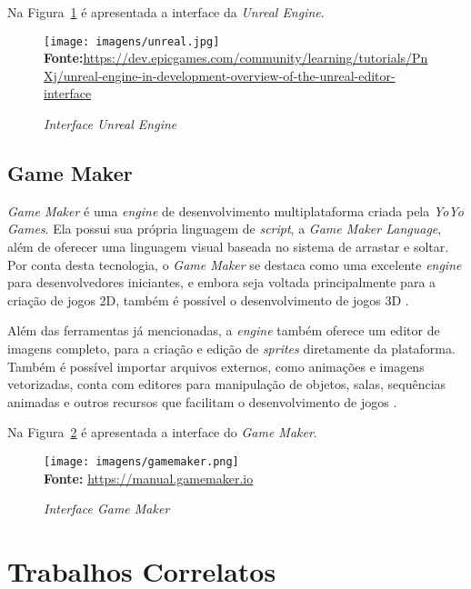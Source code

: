 Na Figura~\ref{fig:unreal} é apresentada a interface da \textit{Unreal Engine}.

\FloatBarrier 
\begin{figure}[!htbp]
	\centering
	\caption{\textit{Interface Unreal Engine}}
	\texttt{[image: imagens/unreal.jpg]}
	\\\textbf{Fonte:}\url{https://dev.epicgames.com/community/learning/tutorials/PnXj/unreal-engine-in-development-overview-of-the-unreal-editor-interface} 
	\label{fig:unreal}
\end{figure}
\FloatBarrier


\subsection{Game Maker}	

\textit{Game Maker} é uma \textit{engine} de desenvolvimento multiplataforma
criada pela \textit{YoYo Games}. Ela possui sua própria linguagem de \textit{script}, a \textit{Game Maker Language}, além de oferecer uma linguagem visual baseada no sistema de arrastar e soltar. Por conta desta tecnologia, o \textit{Game Maker} se destaca como uma excelente \textit{engine} para desenvolvedores iniciantes, e embora seja voltada principalmente para a criação de jogos 2D, também é possível o desenvolvimento de jogos 3D \cite{Sparks2020}.

Além das ferramentas já mencionadas, a \textit{engine} também oferece um editor de imagens completo, para a criação e edição de \textit{sprites} diretamente da plataforma. Também é possível importar arquivos externos, como animações e imagens vetorizadas, conta com editores para manipulação de objetos, salas, sequências animadas e outros recursos que facilitam o desenvolvimento de jogos \cite{GameMakerManual2023}. 

Na Figura~\ref{fig:gamemaker} é apresentada a interface do \textit{Game Maker}.

\FloatBarrier 
\begin{figure}[!htbp]
	\centering
	\caption{\textit{Interface Game Maker}}
	\texttt{[image: imagens/gamemaker.png]}
	\\\textbf{Fonte:} \url{	https://manual.gamemaker.io}
	\label{fig:gamemaker}
\end{figure}
\FloatBarrier


\section{Trabalhos Correlatos}


